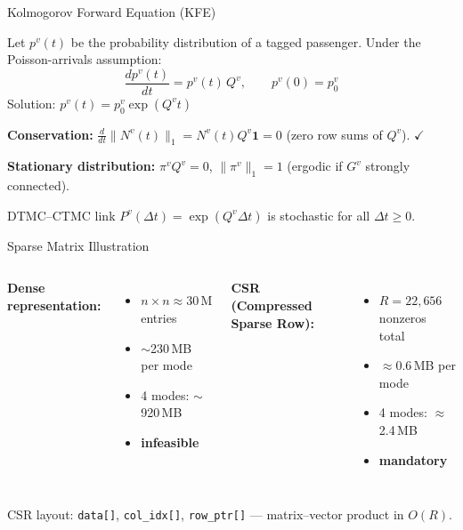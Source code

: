 \documentclass[aspectratio=169,12pt]{beamer}
\begin{document}
\begin{frame}{Kolmogorov Forward Equation (KFE)}
\begin{theorem}[KFE]
Let $p^v(t)$ be the probability distribution of a tagged passenger.
Under the Poisson-arrivals assumption:
\[
\frac{dp^v(t)}{dt} = p^v(t)\,Q^v, \qquad p^v(0)=p^v_0
\]
Solution: $p^v(t) = p^v_0\exp(Q^v t)$
\end{theorem}
\textbf{Conservation:}
$\frac{d}{dt}\|N^v(t)\|_1 = N^v(t)Q^v\mathbf{1} = 0$ (zero row sums of $Q^v$). $\checkmark$

\textbf{Stationary distribution:}
$\pi^v Q^v = 0$, $\|\pi^v\|_1=1$ (ergodic if $G^v$ strongly connected).

\begin{block}{DTMC--CTMC link}
$P^v(\Delta t) = \exp(Q^v\Delta t)$ is stochastic for all $\Delta t\ge0$.
\end{block}
\end{frame}

\begin{frame}{Sparse Matrix Illustration}
\begin{columns}[T]
\textbf{Dense representation:}
\begin{itemize}
  \item $n\times n \approx 30\,\text{M}$ entries
  \item $\sim$230\,MB per mode
  \item 4 modes: $\sim$920\,MB
  \item[\textcolor{warnred}{\ding{55}}] \textbf{infeasible}
\end{itemize}

\textbf{CSR (Compressed Sparse Row):}
\begin{itemize}
  \item $R=22{,}656$ nonzeros total
  \item $\approx$0.6\,MB per mode
  \item 4 modes: $\approx$2.4\,MB
  \item[\textcolor{okgreen}{\ding{51}}] \textbf{mandatory}
\end{itemize}
\end{columns}
\vspace{10pt}
CSR layout: \texttt{data[]}, \texttt{col\_idx[]}, \texttt{row\_ptr[]}
— matrix--vector product in $O(R)$.
\end{frame}
\end{document}
